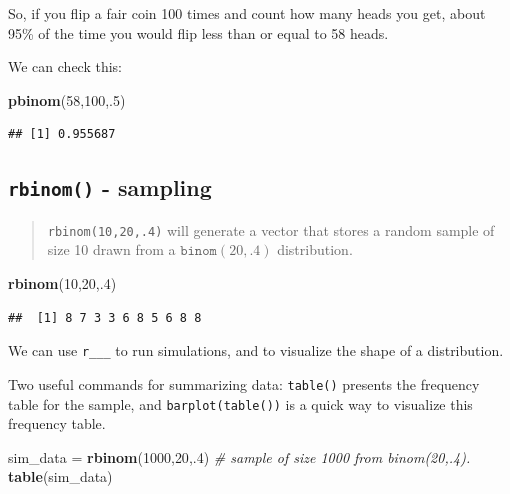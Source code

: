 \documentclass[
]{book}
\newenvironment{Shaded}{\begin{snugshade}}{\end{snugshade}}
\newcommand{\CommentTok}[1]{\textcolor[rgb]{0.56,0.35,0.01}{\textit{#1}}}
\newcommand{\DecValTok}[1]{\textcolor[rgb]{0.00,0.00,0.81}{#1}}
\newcommand{\FunctionTok}[1]{\textcolor[rgb]{0.13,0.29,0.53}{\textbf{#1}}}
\newcommand{\NormalTok}[1]{#1}
\newcommand{\OtherTok}[1]{\textcolor[rgb]{0.56,0.35,0.01}{#1}}
\theoremstyle{definition}
\theoremstyle{definition}
\theoremstyle{definition}
\theoremstyle{definition}
\theoremstyle{remark}
\begin{document}
So, if you flip a fair coin 100 times and count how many heads you get, about 95\% of the time you would flip less than or equal to 58 heads.

We can check this:

\begin{Shaded}
\begin{Highlighting}[]
\FunctionTok{pbinom}\NormalTok{(}\DecValTok{58}\NormalTok{,}\DecValTok{100}\NormalTok{,.}\DecValTok{5}\NormalTok{)}
\end{Highlighting}
\end{Shaded}

\begin{verbatim}
## [1] 0.955687
\end{verbatim}

\subsection*{\texorpdfstring{\texttt{rbinom()} - sampling}{rbinom() - sampling}}\label{rbinom---sampling}

\begin{quote}
\texttt{rbinom(10,20,.4)} will generate a vector that stores a random sample of size 10 drawn from a \(\texttt{binom}(20,.4)\) distribution.
\end{quote}

\begin{Shaded}
\begin{Highlighting}[]
\FunctionTok{rbinom}\NormalTok{(}\DecValTok{10}\NormalTok{,}\DecValTok{20}\NormalTok{,.}\DecValTok{4}\NormalTok{)}
\end{Highlighting}
\end{Shaded}

\begin{verbatim}
##  [1] 8 7 3 3 6 8 5 6 8 8
\end{verbatim}

We can use \texttt{r\_\_\_} to run simulations, and to visualize the shape of a distribution.

Two useful commands for summarizing data: \texttt{table()} presents the frequency table for the sample, and \texttt{barplot(table())} is a quick way to visualize this frequency table.

\begin{Shaded}
\begin{Highlighting}[]
\NormalTok{sim\_data }\OtherTok{=} \FunctionTok{rbinom}\NormalTok{(}\DecValTok{1000}\NormalTok{,}\DecValTok{20}\NormalTok{,.}\DecValTok{4}\NormalTok{) }\CommentTok{\# sample of size 1000 from binom(20,.4).}
\FunctionTok{table}\NormalTok{(sim\_data)}
\end{Highlighting}
\end{Shaded}
\end{document}

